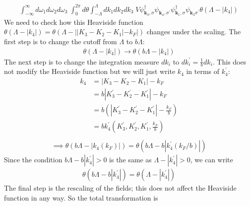 \documentclass[14pt]{extarticle}
\begin{document}
\begin{equation}\begin{aligned}
\int_{-\infty}^\infty d\omega_1 d\omega_2 d\omega_3\;\int_0^{2\pi} d\theta \int_{-\Lambda}^{\Lambda}dk_1 dk_2 dk_3 \;V\psi_{\mathbf k_3,\sigma}^\dagger\psi_{\mathbf k_4,\sigma^\prime}\psi_{\mathbf k_1,\sigma}^\dagger\psi_{\mathbf k_2\sigma^\prime}\theta(\Lambda - |k_4|)
\end{aligned}\end{equation}
We need to check how this Heaviside function \(\theta(\Lambda - |k_4|) = \theta(\Lambda - ||K_3 - K_2 - K_1| - k_F|) \) changes under the scaling. The first step is to change the cutoff from \(\Lambda\) to \(b\Lambda\):
\begin{equation}\begin{aligned}
\theta(\Lambda - |k_4|) \rightarrow \theta(b\Lambda - |k_4|)
\end{aligned}\end{equation}
The next step is to change the integration measure \(dk_i\) to \(dk^\prime_i = \frac{1}{b} dk_i\). This does not modify the Heaviside function but we will just write \(k_4\) in terms of \(k_4^\prime\):
\begin{equation}\begin{aligned}
k_4 &= |K_3 - K_2 - K_1| - k_F \\
      &= b|K_3^\prime - K_2^\prime - K_1^\prime| - k_F\\
      &= b\left(|K_3^\prime - K_2^\prime - K_1^\prime| - \frac{k_F}{b}\right)\\
      &= bk_4^\prime(K_3^\prime , K_2^\prime , K_1^\prime,\frac{k_F}{b})\\
\end{aligned}\end{equation}
\begin{equation}\begin{aligned}
	\implies \theta(b\Lambda - |k_4(k_F)|) = \theta\left(b\Lambda - b\left|k_4^\prime\left(k_F/b\right)\right|\right)
\end{aligned}\end{equation}
Since the condition \(b\Lambda - b|k_4^\prime| > 0\) is the same as \(\Lambda - |k_4^\prime| > 0\), we can write
\begin{equation}\begin{aligned}
\theta(b\Lambda - b|k_4^\prime|) = \theta(\Lambda - |k_4^\prime|)
\end{aligned}\end{equation}
The final step is the rescaling of the fields; this does not affect the Heaviside function in any way. So the total transformation is
\end{document}
